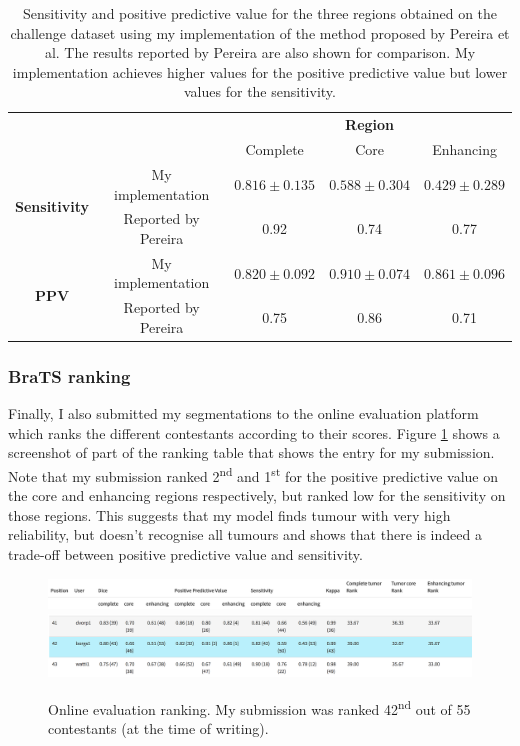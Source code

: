 \documentclass[12pt,a4paper,twoside,openright]{report}
\begin{document}
\begin{table}
\centering	
{\def\arraystretch{1.3}\tabcolsep=5pt
\begin{tabular}{ c  c | c | c | c} 
& \multicolumn{1}{c}{} & \multicolumn{3}{c}{\textbf{Region}} \\
& & Complete & Core & Enhancing \\
\cline{2-5}
\multirow{2}{*}{\textbf{Sensitivity}} & My implementation &	 $0.816 \pm 0.135$ & $0.588 \pm 0.304$  & $0.429 \pm 0.289$ \\
& Reported by Pereira  & 0.92 & 0.74 & 0.77 \\
\cline{2-5}
\multirow{2}{*}{\textbf{PPV}} & My implementation & $0.820 \pm 0.092$ & $0.910 \pm 0.074$ & $0.861 \pm 0.096$ \\
& Reported by Pereira & 0.75 & 0.86 & 0.71 \\
\end{tabular}
}
\caption{Sensitivity and positive predictive value for the three regions obtained on the challenge dataset using my implementation of the method proposed by Pereira et al. The results reported by Pereira are also shown for comparison. My implementation achieves higher values for the positive predictive value but lower values for the sensitivity.}
\label{table:pereira_sensitivity_average}
\end{table}

\subsubsection{BraTS ranking}
Finally, I also submitted my segmentations to the online evaluation platform which ranks the different contestants according to their scores. Figure \ref{fig:online_eval_rank} shows a screenshot of part of the ranking table that shows the entry for my submission. Note that my submission ranked 2\textsuperscript{nd} and 1\textsuperscript{st} for the positive predictive value on the core and enhancing regions respectively, but ranked low for the sensitivity on those regions. This suggests that my model finds tumour with very high reliability, but doesn't recognise all tumours and shows that there is indeed a trade-off between positive predictive value and sensitivity.

\begin{figure}
	\centering
	\label{fig:online_eval_rank}
	\includegraphics[width=\textwidth]{ranking_table_header}
	\includegraphics[width=\textwidth]{pereira_model_ranked_results}
	\caption[Online evaluation ranking.]{Online evaluation ranking. My submission was ranked 42\textsuperscript{nd} out of 55 contestants (at the time of writing).}
\end{figure}
\end{document}
